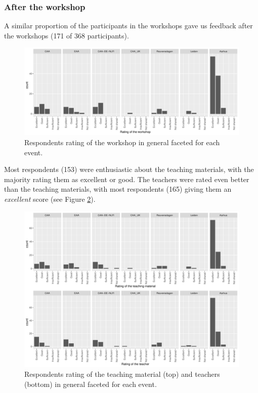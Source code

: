 \documentclass[
]{article}
\begin{document}
\hypertarget{after-the-workshop}{%
\subsubsection{After the workshop}\label{after-the-workshop}}

A similar proportion of the participants in the workshops gave us feedback after the workshops (171 of 368 participants).

\begin{figure}
\centering
\includegraphics{paper_files/figure-latex/rating-workshop-1.pdf}
\caption{\label{fig:rating-workshop}Respondents rating of the workshop in general faceted for each event.}
\end{figure}

Most respondents (153) were enthusiastic about the teaching materials, with the majority rating them as excellent or good. The teachers were rated even better than the teaching materials, with most respondents (165) giving them an \emph{excellent} score (see Figure \ref{fig:rating-teaching}).

\begin{figure}
\centering
\includegraphics{paper_files/figure-latex/rating-teaching-1.pdf}
\caption{\label{fig:rating-teaching}Respondents rating of the teaching material (top) and teachers (bottom) in general faceted for each event.}
\end{figure}
\end{document}
